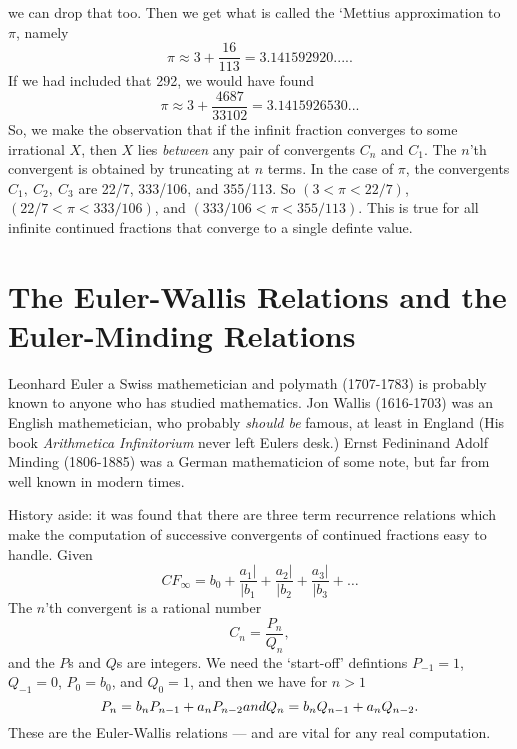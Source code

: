 \documentclass[16pt]{article}
\numberwithin{equation}{section}
\numberwithin{figure}{section}
\numberwithin{figure}{section}
\numberwithin{equation}{section}
\begin{document}
we can drop that too. Then  we get what is called the `Mettius approximation to $\pi$, namely
\begin{equation}
\pi \approx 3+\frac{16}{113}=3.141592920.....
\end{equation}
If we had included that 292, we would have found
\begin{equation}
\pi \approx 3+\frac{4687}{33102}=3.1415926530...
\end{equation}
So, we make the observation that if the infinit fraction converges to
some irrational $X$, then $X$ lies {\em between} any pair of convergents $C_n$
and $C_1$. The $n$'th convergent is obtained by truncating at $n$ terms.
In the case of $\pi$, the convergents $C_1,\>C_2,\>C_3$ are
22/7, 333/106, and 355/113. So $(3 < \pi < 22/7)$, $(22/7 < \pi < 333/106)$,
and $(333/106 < \pi < 355/113)$. This is true for all infinite continued fractions
that converge to a single definte value.

\section{The Euler-Wallis Relations and the Euler-Minding Relations}

Leonhard Euler a Swiss mathemetician and polymath (1707-1783) is probably known to anyone who
has studied mathematics. Jon Wallis (1616-1703) was an English mathemetician, who probably {\em should be}
 famous, at least in England (His book {\em Arithmetica Infinitorium} never left Eulers desk.)
Ernst Fedininand Adolf Minding (1806-1885)  was a German mathematicion of some note, but  far from well
known in modern times.

History aside: it was found that there are three term recurrence relations which make the computation of
successive convergents of continued fractions easy to handle. Given
\begin{equation}
CF_{\infty}=b_0 +\frac{a_1 \vert}{\vert b_1}+\frac{a_2 \vert}{\vert b_2}
+\frac{a_3 \vert}{\vert b_3}+\ldots
\end{equation}
The $n$'th convergent is a rational number
\begin{equation}
C_n=\frac{P_n}{Q_n},
\end{equation}
and the $P$s and $Q$s are integers.
We need the `start-off' defintions $P_{-1}=1$, $Q_{-1}=0$, $P_0=b_0$, and $Q_0=1$,
 and then we have for $n>1$
\begin{equation}
P_n=b_n P_{n-1}+a_n P_{n-2}
$$ and  $$
Q_n=b_n Q_{n-1}+a_n Q_{n-2}.
\end{equation}
These are the Euler-Wallis relations --- and are vital for any real computation.
\end{document}

